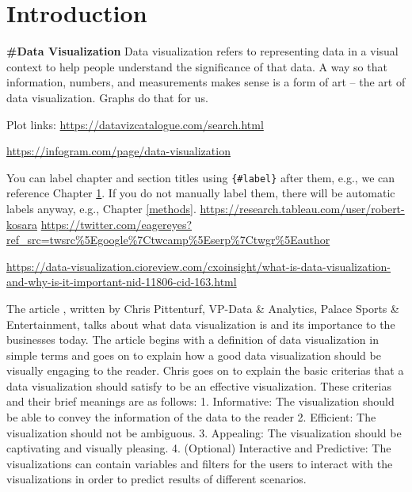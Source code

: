 \documentclass[]{book}
\theoremstyle{definition}
\theoremstyle{definition}
\theoremstyle{definition}
\theoremstyle{remark}
\begin{document}
\chapter{Introduction}\label{intro}

\textbf{\#Data Visualization} Data visualization refers to representing
data in a visual context to help people understand the significance of
that data. A way so that information, numbers, and measurements makes
sense is a form of art -- the art of data visualization. Graphs do that
for us.

Plot links: \url{https://datavizcatalogue.com/search.html}

\url{https://infogram.com/page/data-visualization}

You can label chapter and section titles using \texttt{\{\#label\}}
after them, e.g., we can reference Chapter \ref{intro}. If you do not
manually label them, there will be automatic labels anyway, e.g.,
Chapter \ref{methods}.
\url{https://research.tableau.com/user/robert-kosara}
\url{https://twitter.com/eagereyes?ref_src=twsrc\%5Egoogle\%7Ctwcamp\%5Eserp\%7Ctwgr\%5Eauthor}

\url{https://data-visualization.cioreview.com/cxoinsight/what-is-data-visualization-and-why-is-it-important-nid-11806-cid-163.html}

The article , written by Chris Pittenturf, VP-Data \& Analytics, Palace
Sports \& Entertainment, talks about what data visualization is and its
importance to the businesses today. The article begins with a definition
of data visualization in simple terms and goes on to explain how a good
data visualization should be visually engaging to the reader. Chris goes
on to explain the basic criterias that a data visualization should
satisfy to be an effective visualization. These criterias and their
brief meanings are as follows: 1. Informative: The visualization should
be able to convey the information of the data to the reader 2.
Efficient: The visualization should not be ambiguous. 3. Appealing: The
visualization should be captivating and visually pleasing. 4. (Optional)
Interactive and Predictive: The visualizations can contain variables and
filters for the users to interact with the visualizations in order to
predict results of different scenarios.
\end{document}
